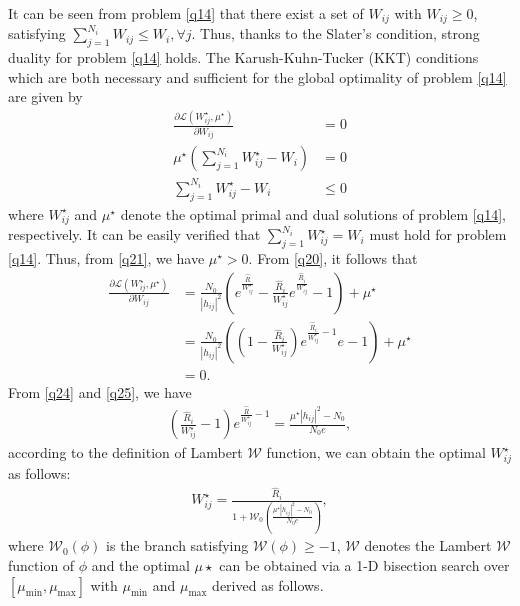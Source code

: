 \documentclass[journal]{IEEEtran}
\begin{document}
It can be seen from problem \eqref{q14} that there exist a set of $W_{ij}$ with $W_{ij} \geq 0$, satisfying $\sum\limits_{j = 1}^{N_i} W_{ij} \leq W_i, \forall j$. Thus, thanks to the Slater's condition, strong duality for problem \eqref{q14} holds. The Karush-Kuhn-Tucker (KKT) conditions which are both necessary and 	sufficient for the  global optimality of problem \eqref{q14} are given by
\begin{align}
\frac{\partial \mathcal{L}\left({W_{ij}^\star}, \mu^\star\right)}{\partial W_{ij}} &= 0 \label{q20} \\
\mu^\star\left(\sum\limits_{j = 1}^{N_i}W_{ij}^\star - W_i\right) &= 0 \label{q21} \\
\sum\limits_{j = 1}^{N_i}W_{ij}^\star - W_i & \leq 0 \label{q22}
\end{align} 
where $W_{ij}^\star$ and $\mu^\star$ denote the optimal primal and dual solutions of problem \eqref{q14}, respectively. It can be easily verified that $\sum\limits_{j = 1}^{N_i} W_{ij}^\star = W_i$ must hold for problem \eqref{q14}. Thus, from \eqref{q21}, we have $\mu^\star > 0$. From \eqref{q20}, it follows that 
\begin{align}
\frac{\partial \mathcal{L} \left(W_{ij}^\star, \mu^\star \right)}{\partial W_{ij}} &= \frac{N_0}{\left|h_{ij}\right|^2} \left(e^{\frac{\hat{R}}{W_{ij}^\star}} -  \frac{\hat{R}_i}{W_{ij}^\star} e^{\frac{\hat{R}_i}{W_{ij}^\star}} - 1\right) + \mu^\star \label{q24} \\
& =  \frac{N_0}{\left|h_{ij}\right|^2}\left(\left(1 - \frac{\hat{R}_i}{W_{ij}^\star}\right)e^{\frac{\hat{R}_i}{W_{ij}^\star} - 1}e - 1\right) + \mu^\star \\
& = 0. \label{q25}
\end{align}
From \eqref{q24} and \eqref{q25}, we have
\begin{align}
\left(\frac{\hat{R}_i}{W_{ij}^\star} - 1\right) e^{\frac{\hat{R}}{W_{ij}^\star} - 1} = \frac{\mu^\star \left|h_{ij}\right|^2 - N_0}{N_0 e},
\end{align}
according to the definition of Lambert $\mathcal{W}$ function, we can obtain the optimal $W_{ij}^\star$ as follows:
\begin{align}
W_{ij}^\star = \frac{\hat{R}_i}{1 + \mathcal{W}_0\left(\frac{\mu^\star \left|h_{ij}\right|^2 - N_0}{N_0 e}\right)} \label{q29},
\end{align}
where $\mathcal{W}_0\left(\phi\right)$ is the branch satisfying $\mathcal{W}\left(\phi\right) \geq -1$, $\mathcal{W}$ denotes the Lambert $\mathcal{W}$ function of $\phi$ \cite{RMCorless} and the optimal $\mu\star$ can be obtained via a 1-D bisection search over $\left[\mu_{\mbox{min}}, \mu_{\mbox{max}}\right]$ with $\mu_{\mbox{min}} $ and $\mu_{\mbox{max}}$ derived as follows.
\end{document}
